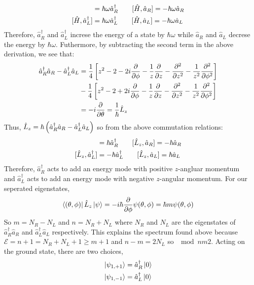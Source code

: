 \documentclass[12pt]{extarticle}
\begin{document}
\begin{align*}
[\hamilt, \hat{a}^\dagger_R] &= \hbar \omega \hat{a}^\dagger_R \quad \quad
[\hamilt, \hat{a}_R] = - \hbar \omega \hat{a}_R \\
[\hamilt, \hat{a}^\dagger_L] &= \hbar \omega \hat{a}^\dagger_L \quad \quad
[\hamilt, \hat{a}_L] = - \hbar \omega \hat{a}_L
\end{align*}
Therefore, $\hat{a}^\dagger_R$ and $\hat{a}^\dagger_L$ increse the energy of a state by $\hbar \omega$ while $\hat{a}_R$ and $\hat{a}_L$ decrese the energy by $\hbar \omega$. Futhermore, by subtracting the second term in the above derivation, we see that:
\begin{align*}
\hat{a}_R^\dagger \hat{a}_R - \hat{a}_L^\dagger \hat{a}_L &= \frac{1}{4} \left[z^2 - 2 - 2i \frac{\partial{}}{\partial{\phi}} - \frac{1}{z} \frac{\partial{}}{\partial{z}} - \frac{\partial^2{}}{\partial{z}^2} - \frac{1}{z^2} \frac{\partial^2{}}{\partial{\phi}^2} \right] \\ & - 
\frac{1}{4} \left[z^2 - 2 + 2i \frac{\partial{}}{\partial{\phi}} - \frac{1}{z} \frac{\partial{}}{\partial{z}} - \frac{\partial^2{}}{\partial{z}^2} - \frac{1}{z^2} \frac{\partial^2{}}{\partial{\phi}^2} \right] \\ & = -i \frac{\partial{}}{\partial{\theta}} = \frac{1}{\hbar} \hat{L}_z
\end{align*}
Thus, $\hat{L}_z = \hbar \left( \hat{a}_R^\dagger \hat{a}_R - \hat{a}_L^\dagger \hat{a}_L \right)$ so from the above commutation relations:
\begin{align*}
[\Lz, \hat{a}^\dagger_R] &= \hbar \hat{a}^\dagger_R \quad \quad
[\Lz, \hat{a}_R] = - \hbar \hat{a}_R \\
[\Lz, \hat{a}^\dagger_L] &= - \hbar \hat{a}^\dagger_L \quad \quad
[\Lz, \hat{a}_L] =  \hbar \hat{a}_L
\end{align*}
Therefore, $\hat{a}^\dagger_R$ acts to add an energy mode with positive $z$-angluar momentum and $\hat{a}^\dagger_L$ acts to add an energy mode with negative $z$-angular momentum. For our seperated eigenstates, 
\[\left< (\theta, \phi) \right| \hat{L}_z \left| \psi \right> = - i \hbar \frac{\partial{}}{\partial{\phi}} \psi(\theta, \phi) = \hbar m \psi(\theta, \phi) \] 
So $m = N_R - N_L$ and $n = N_R + N_L$ where $N_R$ and $N_L$ are the eigenstates of $\hat{a}^\dagger_R \hat{a}_R$ and $\hat{a}^\dagger_L \hat{a}_L$ respectively.
This explains the spectrum found above because $\mathcal{E} = n + 1 = N_R + N_L + 1 \ge m + 1$ and $n - m = 2 N_L$ so $\mod{n}{m}{2}$.
Acting on the ground state, there are two choices,
\begin{align*}
\left| \psi_{1, +1} \right> &= \hat{a}^\dagger_R \left| 0 \right> \\
\left| \psi_{1, -1} \right> &= \hat{a}^\dagger_L \left| 0 \right> \\
\end{align*} 
\end{document}
